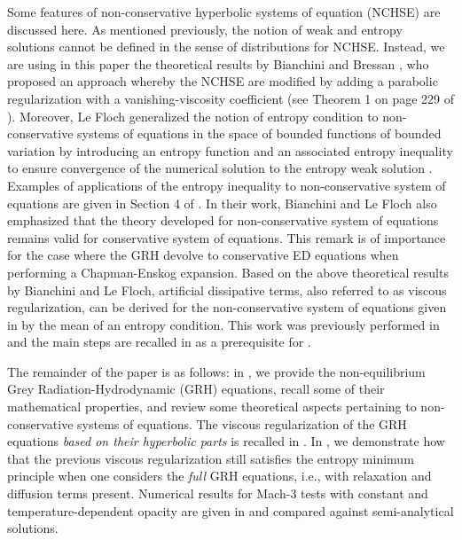 \documentclass[times,doublespace]{fldauth}%
\begin{document}
Some features of non-conservative hyperbolic systems of equation (NCHSE) are discussed here. As mentioned previously, 
the notion of weak and entropy solutions cannot be defined in the sense of distributions for NCHSE. Instead, we are using in this paper the theoretical results by 
Bianchini and Bressan \cite{bianchini_bressan_2005}, who proposed an approach whereby the NCHSE are modified by adding a parabolic regularization 
with a vanishing-viscosity coefficient (see Theorem 1 on page 229 of \cite{bianchini_bressan_2005}). Moreover, Le Floch generalized the notion of entropy 
condition to non-conservative systems of equations in the space of bounded functions of bounded variation by introducing an entropy function 
and an associated entropy inequality to ensure convergence of the numerical solution to the entropy weak solution \cite{lefloch_1988}. Examples of applications of the
entropy inequality to non-conservative system of equations are given in Section 4 of \cite{lefloch_1988}. In their work, Bianchini and Le Floch also emphasized that the theory developed for non-conservative system of equations remains valid for conservative system of equations. This remark is of importance for the case where the GRH devolve to conservative ED equations when performing a Chapman-Enskog expansion. Based on the above theoretical results by Bianchini and Le Floch, artificial dissipative terms, also referred to as viscous regularization, can be derived for the non-conservative system of equations given in  by the mean of an entropy condition. This work was previously performed in \cite{our_jcp_radhy_paper} and the main steps are recalled in  as a prerequisite for .

The remainder of the paper is as follows: in , we provide
the non-equilibrium Grey Radiation-Hydrodynamic (GRH) equations, recall some of their mathematical properties, 
and review some theoretical aspects pertaining to non-conservative systems of equations. 
The viscous regularization of the GRH equations {\it based on their hyperbolic parts} is recalled in .
In , we demonstrate how that the previous viscous regularization still satisfies the entropy minimum 
principle when one considers the {\it full} GRH equations, i.e., with relaxation and diffusion terms present. 
Numerical results for Mach-3 tests with constant and temperature-dependent opacity are given in  and 
compared against semi-analytical solutions.
%
\end{document}
